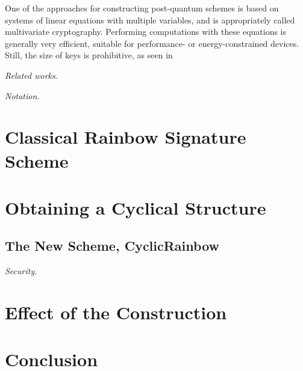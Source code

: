 \documentclass[a4paper, 14pt]{extarticle}
\begin{document}
One of the approaches for constructing post-quantum schemes is based on systems of linear equations with multiple variables, and is appropriately called multivariate cryptography. Performing computations with these equations is generally very efficient, suitable for performance- or energy-constrained devices. Still, the size of keys is prohibitive, as seen in~\cite[]{petzoldt2013selecting}

\emph{Related works.}

\emph{Notation.}

\section{Classical Rainbow Signature Scheme}

\section{Obtaining a Cyclical Structure}

\subsection{The New Scheme, CyclicRainbow}

\emph{Security.}

\section{Effect of the Construction}

\section{Conclusion}


{\small
}
\end{document}
